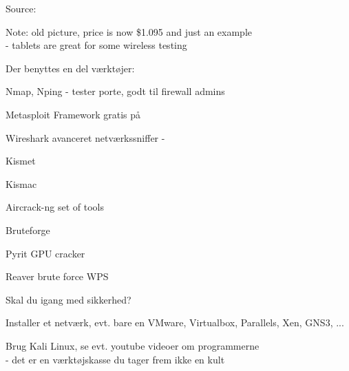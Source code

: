 \documentclass[20pt,landscape,a4paper,footrule]{foils}
\begin{document}


Source: 

Note: old picture, price is now \$1.095 and just an example\\
 - tablets are great for some wireless testing


\begin{list1}
\item Der benyttes en del værktøjer:
\begin{list2}
\item Nmap, Nping - tester porte, godt til firewall admins 
\item Metasploit Framework gratis på 
\item Wireshark avanceret netværkssniffer - 

\item Kismet 
\item Kismac 

\item Aircrack-ng set of tools 
\item Bruteforge 
\item Pyrit GPU cracker 
\item Reaver brute force WPS 
\end{list2}
\end{list1}



\begin{list1}
\item Skal du igang med sikkerhed?
\item Installer et netværk, evt. bare en VMware, Virtualbox, Parallels, Xen, GNS3, ...
\item Brug Kali Linux, se evt. youtube videoer om programmerne\\
- det er en værktøjskasse du tager frem ikke en kult \smiley
\end{list1}
\end{document}
